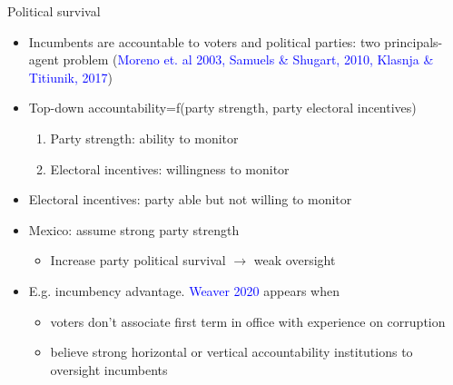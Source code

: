 \documentclass{beamer}
\begin{document}
\begin{frame}[label=survival]{Political survival}

\begin{itemize}
 		  \setlength\itemsep{0.5em}
	
	\item Incumbents are accountable to voters and political parties: two principals-agent problem (\textcolor{blue}{Moreno et. al 2003, Samuels \& Shugart, 2010, Klasnja \& Titiunik, 2017})
	\item Top-down accountability=f(party strength, party electoral incentives)
	\begin{enumerate}
		\item Party strength: ability to monitor
		\item Electoral incentives: willingness to monitor
	\end{enumerate}
	\item Electoral incentives: party able but not willing to monitor
	\item Mexico: assume strong party strength
		\begin{itemize}
		\item \alert{Increase party political survival $\rightarrow$ weak oversight} 
		\end{itemize}

	\item E.g. incumbency advantage. \textcolor{blue}{Weaver 2020} appears when
		\begin{itemize}
		\item voters don't associate first term in office with experience on corruption
		\item believe strong horizontal or vertical accountability institutions to oversight incumbents
		\end{itemize}
	
\end{itemize} 
	
\end{frame} 
\end{document}
